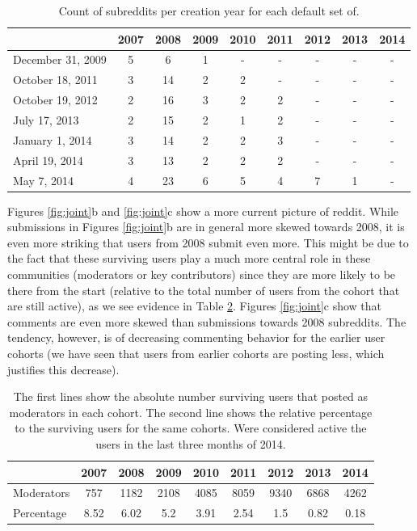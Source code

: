 \begin{table}[htbp]
\centering
\tabcolsep=0.11cm
\singlespacing
\fontsize{7pt}{8pt}\selectfont
\begin{tabular}{|>{\raggedright\centering\arraybackslash}m{1.5cm}|c|c|c|c|c|c|c|c|}
\hline
 & 2007 & 2008 & 2009 & 2010 & 2011 & 2012 & 2013 & 2014 \\ \hline
December 31, 2009 & 5 & 6 & 1 & - & - & - & - & - \\ \hline
October 18, 2011 & 3 & 14 & 2 & 2 & - & - & - & - \\ \hline
October 19, 2012 & 2 & 16 & 3 & 2 & 2 & - & - & - \\ \hline
July 17, 2013 & 2 & 15 & 2 & 1 & 2 & - & - & - \\ \hline
January 1, 2014 & 3 & 14 & 2 & 2 & 3 & - & - & - \\ \hline
April 19, 2014 & 3 & 13 & 2 & 2 & 2 & - & - & - \\ \hline
May 7, 2014 & 4 & 23 & 6 & 5 & 4 & 7 & 1 & - \\ \hline
\end{tabular}
\caption{Count of subreddits per creation year for each default set of.}
\label{tab:defaults}
\end{table}

Figures \ref{fig:joint}b and \ref{fig:joint}c show a more current picture of reddit. While submissions in Figures \ref{fig:joint}b are in general more skewed towards 2008, it is even more striking that users from 2008 submit even more. This might be due to the fact that these surviving users play a much more central role in these communities (moderators or key contributors) since they are more likely to be there from the start (relative to the total number of users from the cohort that are still active), as we see evidence in Table \ref{tab:mods}. Figures \ref{fig:joint}c show that comments are even more skewed than submissions towards 2008 subreddits. The tendency, however, is of decreasing commenting behavior for the earlier user cohorts (we have seen that users from earlier cohorts are posting less, which justifies this decrease).

\begin{table}[htbp]
\centering
\tabcolsep=0.11cm
\singlespacing
\fontsize{7pt}{8pt}\selectfont
\begin{tabular}{|l|c|c|c|c|c|c|c|c|}
\hline
 & 2007 & 2008 & 2009 & 2010 & 2011 & 2012 & 2013 & 2014 \\ \hline
Moderators & 757 & 1182 & 2108 & 4085 & 8059 & 9340 & 6868 & 4262 \\ \hline
Percentage & 8.52 & 6.02 & 5.2 & 3.91 & 2.54 & 1.5 & 0.82 & 0.18 \\ \hline
\end{tabular}
\caption{The first lines show the absolute number surviving users that posted as moderators in each cohort. The second line shows the relative percentage to the surviving users for the same cohorts. Were considered active the users in the last three months of 2014.}
\label{tab:mods}
\end{table}
